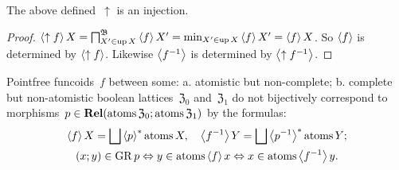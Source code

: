 \begin{prop}
The above defined~$\uparrow$ is an injection.
\end{prop}

\begin{proof}
$\left\langle \uparrow f\right\rangle X = \bigsqcap^{\mathfrak{B}}_{X'\in\operatorname{up} X} \left\langle f\right\rangle X' = \min_{X'\in\operatorname{up} X} \left\langle f\right\rangle X' = \left\langle f\right\rangle X$.
So $\left\langle f\right\rangle$ is determined by $\left\langle \uparrow f\right\rangle$. Likewise $\left\langle f^{-1}\right\rangle$ is determined by $\left\langle \uparrow f^{-1}\right\rangle$.
\end{proof}

\begin{conjecture}
Pointfree funcoids~$f$ between some: a. atomistic but non-complete; b. complete but non-atomistic boolean lattices~$\mathfrak{Z}_0$ and~$\mathfrak{Z}_1$
do not bijectively correspond to morphisms~$p\in\mathbf{Rel}(\operatorname{atoms}\mathfrak{Z}_0;\operatorname{atoms}\mathfrak{Z}_1)$ by the formulas:
\begin{gather*}
\left\langle f\right\rangle X = \bigsqcup\left\langle p\right\rangle ^{\ast}\operatorname{atoms} X, \quad
\left\langle f^{-1}\right\rangle Y = \bigsqcup\left\langle p^{-1}\right\rangle ^{\ast}\operatorname{atoms} Y; \\
(x;y)\in\operatorname{GR} p \Leftrightarrow y\in\operatorname{atoms}\left\langle f\right\rangle x \Leftrightarrow x\in\operatorname{atoms}\left\langle f^{-1}\right\rangle y.
\end{gather*}
\end{conjecture}
